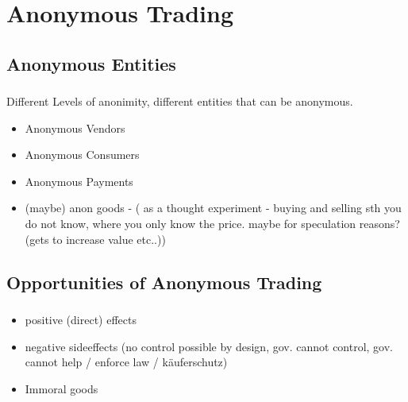 \section{Anonymous Trading}

\subsection{Anonymous Entities}

\begin{frame}
    \frametitle{\insertsubsection}
    Different Levels of anonimity, different entities that can be anonymous.
    \begin{itemize}
        \item Anonymous Vendors
        \item Anonymous Consumers
        \item Anonymous Payments
        \item (maybe) anon goods - ( as a thought experiment - buying and selling sth you do not know, where you only know the price. maybe for speculation reasons? (gets to increase value etc..))
    \end{itemize}
\end{frame}


\subsection{Opportunities of Anonymous Trading}

\begin{frame}
    \frametitle{\insertsubsection}
    \begin{itemize}
        \item positive (direct) effects
        \item negative sideeffects (no control possible by design, gov. cannot control, gov. cannot help / enforce law / käuferschutz)
        \item Immoral goods
    \end{itemize}
\end{frame}